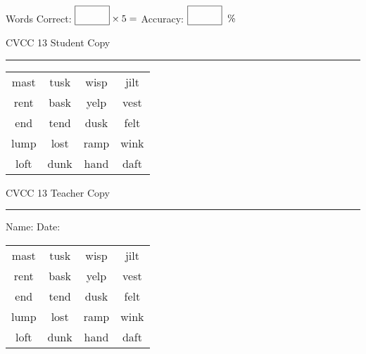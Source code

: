 \documentclass{memoir}
\begin{document}
\small

Words Correct: $\fbox{\phantom{\huge 100}} \times 5 = $ Accuracy: $\fbox{\phantom{\huge 100}}\;\; \%$ 

\vfill

\newpage


\footnotesize \noindent
CVCC 13 \hfill Student Copy
\smallskip
\hrule

\Large

\setlength{\tabcolsep}{14pt}
\def\arraystretch{3}

{\selectfont


\begin{vplace}[0.5]
\begin{center}
\begin{tabular}{cccc}
mast & tusk & wisp & jilt \\
rent & bask & yelp & vest \\
end & tend & dusk & felt \\
lump & lost & ramp & wink \\
loft & dunk & hand & daft \\
\end{tabular}
\end{center}
\end{vplace}

}

\newpage

\footnotesize \noindent
CVCC 13 \hfill Teacher Copy
\smallskip
\hrule

\small

\vfill

\noindent
Name: \underline{\hspace{1.75in}} \hfill Date: \underline{\hspace{1in}}

\Large

{\selectfont


\begin{vplace}[0.5]
\begin{center}
\begin{tabular}{cccc}
mast & tusk & wisp & jilt \\
rent & bask & yelp & vest \\
end & tend & dusk & felt \\
lump & lost & ramp & wink \\
loft & dunk & hand & daft \\
\end{tabular}
\end{center}
\end{vplace}



}
\end{document}
